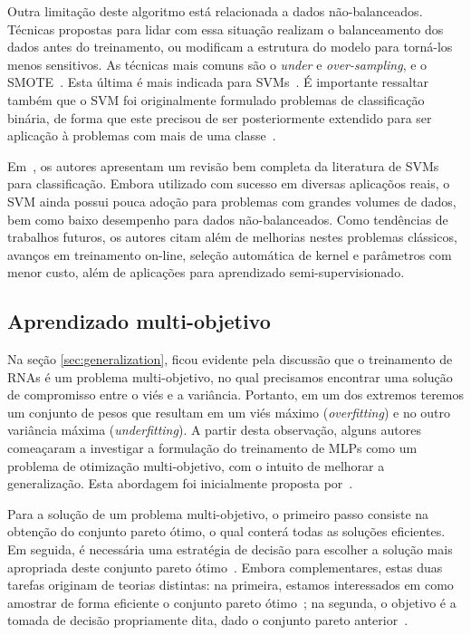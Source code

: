 \documentclass[conference]{IEEEtran}
\begin{document}
 	Outra limitação deste algoritmo está relacionada a dados não-balanceados. Técnicas propostas para lidar com essa situação realizam o balanceamento dos dados antes do treinamento, ou modificam a estrutura do modelo para torná-los menos sensitivos. As técnicas mais comuns são o \textit{under} e \textit{over-sampling}, e o SMOTE~\cite{chawla2002smote}. Esta última é mais indicada para SVMs~\cite{chawla2003smoteboost}. É importante ressaltar também que o SVM foi originalmente formulado problemas de classificação binária, de forma que este precisou de ser posteriormente extendido para ser aplicação à problemas com mais de uma classe~\cite{weston1998multi, liu2005one}.
	
	Em~\cite{cervantes2020comprehensive}, os autores apresentam um revisão bem completa da literatura de SVMs para classificação. Embora utilizado com sucesso em diversas aplicaçõos reais, o SVM ainda possui pouca adoção para problemas com grandes volumes de dados, bem como baixo desempenho para dados não-balanceados. Como tendências de trabalhos futuros, os autores citam além de melhorias nestes problemas clássicos, avanços em treinamento on-line, seleção automática de kernel e parâmetros com menor custo, além de aplicações para aprendizado semi-supervisionado.
	
	\subsection{Aprendizado multi-objetivo}
	
	Na seção \ref{sec:generalization}, ficou evidente pela discussão que o treinamento de RNAs é um problema multi-objetivo, no qual precisamos encontrar uma solução de compromisso entre o viés e a variância. Portanto, em um dos extremos teremos um conjunto de pesos que resultam em um viés máximo (\textit{overfitting}) e no outro variância máxima (\textit{underfitting}). A partir desta observação, 
	alguns autores comeaçaram a investigar a formulação do treinamento de MLPs como um problema de otimização multi-objetivo, com o intuito de melhorar a generalização. Esta abordagem foi inicialmente proposta por~\cite{de2000improving}.
	
	Para a solução de um problema multi-objetivo, o primeiro passo consiste na obtenção do conjunto pareto ótimo, o qual conterá todas as soluções eficientes. Em seguida, é necessária uma estratégia de decisão para escolher a solução mais apropriada deste conjunto pareto ótimo~\cite{deb2014multi}. Embora complementares, estas duas tarefas originam de teorias distintas: na primeira, estamos interessados em como amostrar de forma eficiente o conjunto pareto ótimo~\cite{collette2004multiobjective}; na segunda, o objetivo é a tomada de decisão propriamente dita, dado o conjunto pareto anterior~\cite{parreiras2005decision}. 
	
\end{document}
